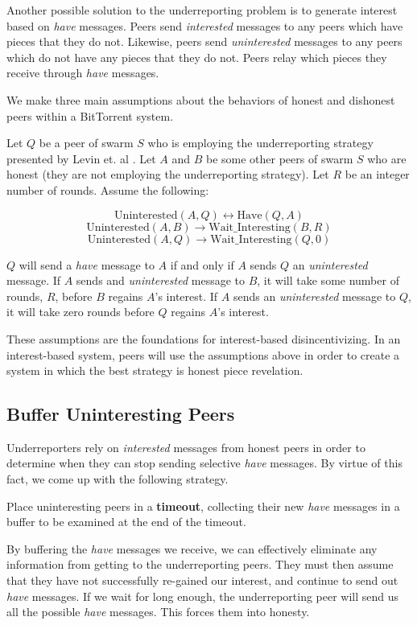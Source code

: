 Another possible solution to the underreporting problem is to generate interest based on \textit{have} messages. Peers send \textit{interested} messages to any peers which have pieces that they do not. Likewise, peers send \textit{uninterested} messages to any peers which do not have any pieces that they do not. Peers relay which pieces they receive through \textit{have} messages.

We make three main assumptions about the behaviors of honest and dishonest peers within a BitTorrent system.

Let $Q$ be a peer of swarm $S$ who is employing the underreporting strategy presented by Levin et. al \cite{dlbittorrent}. Let $A$ and $B$ be some other peers of swarm $S$ who are honest (they are not employing the underreporting strategy). Let $R$ be an integer number of rounds. Assume the following:

$$ \mathrm{Uninterested}(A, Q) \longleftrightarrow \mathrm{Have}(Q, A) $$
$$ \mathrm{Uninterested}(A, B) \longrightarrow \mathrm{Wait\_Interesting}(B, R) $$
$$ \mathrm{Uninterested}(A, Q) \longrightarrow \mathrm{Wait\_Interesting}(Q, 0) $$\newline

$Q$ will send a \textit{have} message to $A$ if and only if $A$ sends $Q$ an \textit{uninterested} message. If $A$ sends and \textit{uninterested} message to $B$, it will take some number of rounds, $R$, before $B$ regains $A$'s interest. If $A$ sends an \textit{uninterested} message to $Q$, it will take zero rounds before $Q$ regains $A$'s interest.

These assumptions are the foundations for interest-based disincentivizing. In an interest-based system, peers will use the assumptions above in order to create a system in which the best strategy is honest piece revelation.

\subsection{Buffer Uninteresting Peers}

Underreporters rely on \textit{interested} messages from honest peers in order to determine when they can stop sending selective \textit{have} messages. By virtue of this fact, we come up with the following strategy.

Place uninteresting peers in a \textbf{timeout}, collecting their new \textit{have} messages in a buffer to be examined at the end of the timeout.

By buffering the \textit{have} messages we receive, we can effectively eliminate any information from getting to the underreporting peers. They must then assume that they have not successfully re-gained our interest, and continue to send out \textit{have} messages. If we wait for long enough, the underreporting peer will send us all the possible \textit{have} messages. This forces them into honesty.

